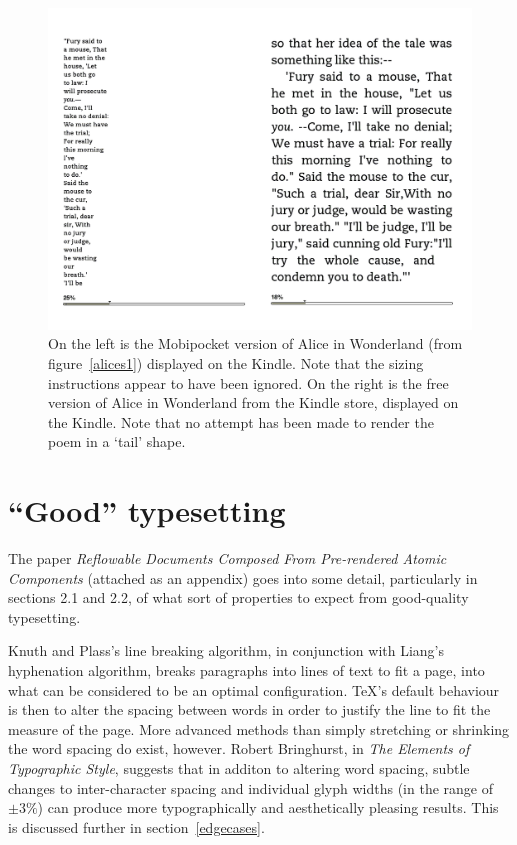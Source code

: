 \begin{figure}[tb]
\begin{center}
\vspace{-.3in}
\includegraphics[width=\textwidth]{gfx/alices2}
\end{center}
\vspace{-.3in}
\caption[The same document in EPUB and Mobipocket formats, displayed on the Kindle Keyboard]{On the
left is the Mobipocket version of Alice in Wonderland (from figure~\ref{alices1}) displayed on the
Kindle. Note that the sizing instructions appear to have been ignored. On the right is the free
version of Alice in Wonderland from the Kindle store, displayed on the Kindle. Note that no attempt
has been made to render the poem in a `tail' shape.}
\label{alices2}
\end{figure}

\section{``Good'' typesetting}
\label{goodtypesetting}
The paper \emph{Reflowable Documents Composed From Pre-rendered Atomic Components}\cite{Pinkney2011}
(attached as an appendix) goes into some detail, particularly in sections 2.1 and 2.2, of what sort
of properties to expect from good-quality typesetting.

Knuth and Plass's line breaking algorithm\cite{Knuth1981}, in conjunction with Liang's hyphenation
algorithm\cite{Liang1983}, breaks paragraphs into lines of text to fit a page, into what can be
considered to be an optimal configuration. \TeX 's default behaviour is then to alter the spacing
between words in order to justify the line to fit the measure of the page. More advanced methods
than simply stretching or shrinking the word spacing do exist, however. Robert Bringhurst, in
\emph{The Elements of Typographic Style}\cite{Bringhurst2008}, suggests that in additon to altering
word spacing, subtle changes to inter-character spacing and individual glyph widths (in the range of
$\pm 3 \%$) can produce more typographically and aesthetically pleasing results. This is discussed
further in section~\ref{edgecases}.




